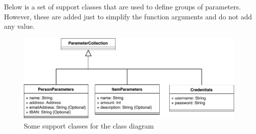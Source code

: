 Below is a set of support classes that are used to define groups of parameters. However, these are added just to simplify the function arguments and do not add any value.



\begin{figure}[H]
	\centering
	\includegraphics{uml/classdiagramsupport.pdf}
	\caption*{Some support classes for the class diagram}
\end{figure}